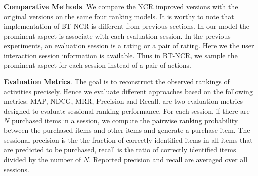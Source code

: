 \documentclass[letterpaper]{article} %
\begin{document}
\textbf{Comparative Methods}. We compare the NCR improved versions with the original versions on the same four ranking models. It is worthy to note that implementation of BT-NCR is different from previous sections.  In our model the prominent aspect is associate with each evaluation session. In the previous experiments, an evaluation session is a rating or a pair of rating. Here we the user interaction session information is available. Thus in BT-NCR, we sample the prominent aspect for each session instead of a pair of actions.  

\textbf{Evaluation Metrics}.  The goal is to reconstruct the observed rankings of activities precisely. Hence we evaluate different approaches based on the following metrics: MAP, NDCG, MRR, Precision and Recall.  are two evaluation metrics designed to evaluate sessional ranking performance. For each session, if there are $N$ purchased items in a session, we compute the pairwise ranking probability between the purchased items and other items and generate a purchase item. The sessional precision is the the fraction of correctly identified items in all items that are predicted to be purchased, recall is the ratio of correctly identified items divided by the number of $N$. Reported precision and recall are averaged over all sessions.  
\end{document}
